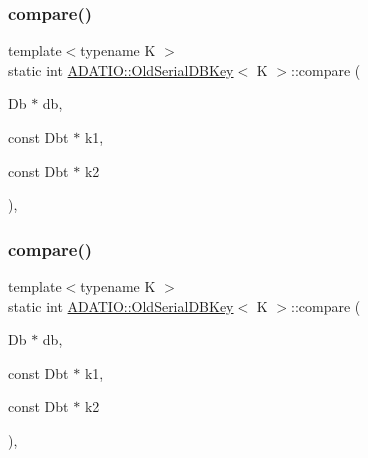 \subsubsection{\texorpdfstring{compare()}{compare()}\hspace{0.1cm}{\footnotesize\ttfamily [1/3]}}
{\footnotesize\ttfamily template$<$typename K $>$ \\
static int \mbox{\hyperlink{classADATIO_1_1OldSerialDBKey}{A\+D\+A\+T\+I\+O\+::\+Old\+Serial\+D\+B\+Key}}$<$ K $>$\+::compare (\begin{DoxyParamCaption}\item[{Db $\ast$}]{db,  }\item[{const Dbt $\ast$}]{k1,  }\item[{const Dbt $\ast$}]{k2 }\end{DoxyParamCaption})\hspace{0.3cm}{\ttfamily [inline]}, {\ttfamily [static]}}

\mbox{\label{classADATIO_1_1OldSerialDBKey_a9f6e624dc2c8940397632286dbab1f61}} 
\subsubsection{\texorpdfstring{compare()}{compare()}\hspace{0.1cm}{\footnotesize\ttfamily [2/3]}}
{\footnotesize\ttfamily template$<$typename K $>$ \\
static int \mbox{\hyperlink{classADATIO_1_1OldSerialDBKey}{A\+D\+A\+T\+I\+O\+::\+Old\+Serial\+D\+B\+Key}}$<$ K $>$\+::compare (\begin{DoxyParamCaption}\item[{Db $\ast$}]{db,  }\item[{const Dbt $\ast$}]{k1,  }\item[{const Dbt $\ast$}]{k2 }\end{DoxyParamCaption})\hspace{0.3cm}{\ttfamily [inline]}, {\ttfamily [static]}}

\mbox{\label{classADATIO_1_1OldSerialDBKey_a9f6e624dc2c8940397632286dbab1f61}} 
